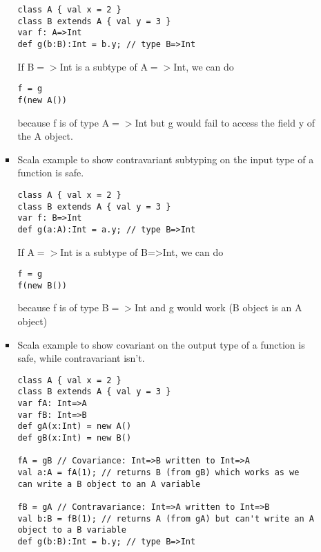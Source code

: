 \documentclass[10pt]{article}
\begin{document}
\begin{enumerate}
\begin{enumerate}
\begin{itemize}
                \begin{verbatim}
class A { val x = 2 }
class B extends A { val y = 3 }
var f: A=>Int
def g(b:B):Int = b.y; // type B=>Int
                \end{verbatim}
                If B$=>$Int is a subtype of A$=>$Int, we can do
                \begin{verbatim}
f = g
f(new A())
                \end{verbatim}
                because f is of type A$=>$Int but g would fail to access the field y of the A object.
                \item Scala example to show contravariant subtyping on the input type of a function is safe.
                \begin{verbatim}
class A { val x = 2 }
class B extends A { val y = 3 }
var f: B=>Int
def g(a:A):Int = a.y; // type B=>Int
                \end{verbatim}
                If A$=>$Int is a subtype of B=>Int, we can do
                \begin{verbatim}
f = g
f(new B())
                \end{verbatim}
                because f is of type B$=>$Int and g would work (B object is an A object)
                \item Scala example to show covariant on the output type of a function is safe, while contravariant isn't.
                \begin{verbatim}
class A { val x = 2 }
class B extends A { val y = 3 }
var fA: Int=>A
var fB: Int=>B
def gA(x:Int) = new A()
def gB(x:Int) = new B()

fA = gB // Covariance: Int=>B written to Int=>A
val a:A = fA(1); // returns B (from gB) which works as we can write a B object to an A variable

fB = gA // Contravariance: Int=>A written to Int=>B
val b:B = fB(1); // returns A (from gA) but can't write an A object to a B variable
def g(b:B):Int = b.y; // type B=>Int
                \end{verbatim}
            \end{itemize}
            

\end{enumerate}
\end{enumerate}
\end{document}
